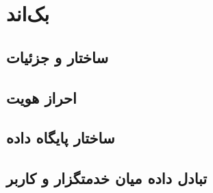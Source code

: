 \chapter{بک‌اند}
    \section{ساختار و جزئیات }
    \section{احراز هویت}
    \section{ساختار پایگاه داده}
    \section{تبادل داده میان خدمتگزار و کاربر}